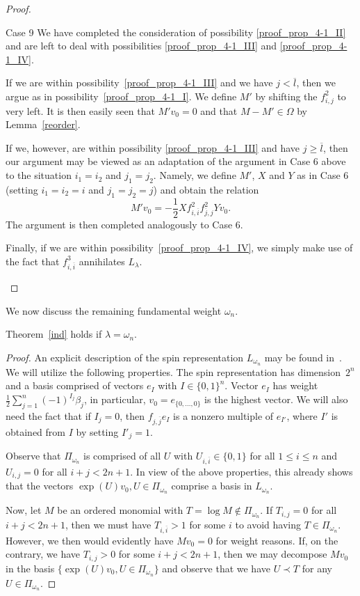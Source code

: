 \documentclass[ALCO,ThmDefs,Unicode]{cedram}
\newcommand{\la}{\lambda}
\begin{document}
\begin{proof}
\begin{enonce*}[remark]{Case 9}
We have completed the consideration of possibility \ref{proof_prop_4-1_II} and are left to deal with possibilities \ref{proof_prop_4-1_III} and \ref{proof_prop_4-1_IV}.

If we are within possibility~\ref{proof_prop_4-1_III} and we have $j<\overline l$, then we argue as in possibility~\ref{proof_prop_4-1_I}. We define $M'$ by shifting the $f_{i,j}^2$ to very left. It is then easily seen that $M'v_0=0$ and that $M-M'\in\Omega$ by Lemma~\ref{reorder}.

If we, however, are within possibility \ref{proof_prop_4-1_III} and have $j\ge\overline l$, then our argument may be viewed as an adaptation of the argument in Case 6 above to the situation $i_1=i_2$ and $j_1=j_2$. Namely, we define $M'$, $X$ and $Y$ as in Case 6 (setting $i_1=i_2=i$ and $j_1=j_2=j$) and obtain the relation
\[
M'v_0=-\frac12Xf_{i,\overline i}^2f_{\overline j,j}^2Yv_0.
\]
The argument is then completed analogously to Case 6.

Finally, if we are within possibility~\ref{proof_prop_4-1_IV}, we simply make use of the fact that $f_{i,\overline i}^3$ annihilates $L_\lambda$.\qedhere
\end{enonce*}
\end{proof}

We now discuss the remaining fundamental weight $\omega_n$.

\begin{prop}
Theorem~\ref{ind} holds if $\la=\omega_n$.
\end{prop}
\begin{proof}
An explicit description of the spin representation $L_{\omega_n}$ may be found in~\cite{carter}. We will utilize the following properties. The spin representation has dimension~$2^n$ and a basis comprised of vectors $e_I$ with $I\in\{0,1\}^n$. Vector $e_I$ has weight $\frac12\sum_{j=1}^n (-1)^{I_j}\beta_j$, in particular, $v_0=e_{\{0,\dots,0\}}$ is the highest vector. We will also need the fact that if $I_j=0$, then $f_{j,\overline j}e_{I}$ is a nonzero multiple of $e_{I'}$, where $I'$ is obtained from $I$ by setting $I'_j=1$.

Observe that $\Pi_{\omega_n}$ is comprised of all $U$ with $U_{i,\overline i}\in\{0,1\}$ for all $1\le i\le n$ and $U_{i,j}=0$ for all $i+j<2n+1$. In view of the above properties, this already shows that the vectors $\exp(U)v_0,U\in\Pi_{\omega_n}$ comprise a basis in $L_{\omega_n}$.

Now, let $M$ be an ordered monomial with $T=\log M\notin\Pi_{\omega_n}$. If $T_{i,j}=0$ for all $i+j<2n+1$, then we must have $T_{i,\overline i}>1$ for some $i$ to avoid having $T\in\Pi_{\omega_n}$. However, we then would evidently have $Mv_0=0$ for weight reasons. If, on the contrary, we have $T_{i,j}>0$ for some $i+j<2n+1$, then we may decompose $Mv_0$ in the basis $\{\exp(U)v_0,U\in\Pi_{\omega_n}\}$ and observe that we have $U\prec T$ for any $U\in\Pi_{\omega_n}$.
\end{proof}
\end{document}
